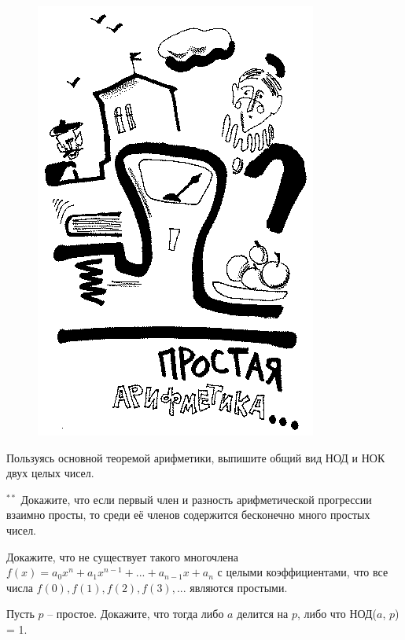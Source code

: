 \begin{figure}[H]
\begin{minipage}{0.29\linewidth}
    \includegraphics[width=0.95\columnwidth]{img/10.8 img2.png}
\end{minipage}
\end{figure}

\begin{ex}
    Пользуясь основной теоремой арифметики, выпишите общий вид НОД и НОК двух целых чисел.
\end{ex}

\begin{thm} $^{**}$
    Докажите, что если первый член и разность арифметической прогрессии взаимно просты, то среди её членов содержится бесконечно много простых чисел.
\end{thm}

\begin{thm}
    Докажите, что не существует такого многочлена $f(x) = a_0 x^n + a_1 x^{n - 1} + ... + a_{n - 1} x + a_n$ с целыми
коэффициентами, что все числа $f(0), f(1), f(2), f(3), ...$ являются простыми.
\end{thm}

\begin{thm}
    Пусть $p$ -- простое. Докажите, что тогда либо $a$ делится на $p$, либо что НОД($a$, $p$) = 1.
\end{thm}